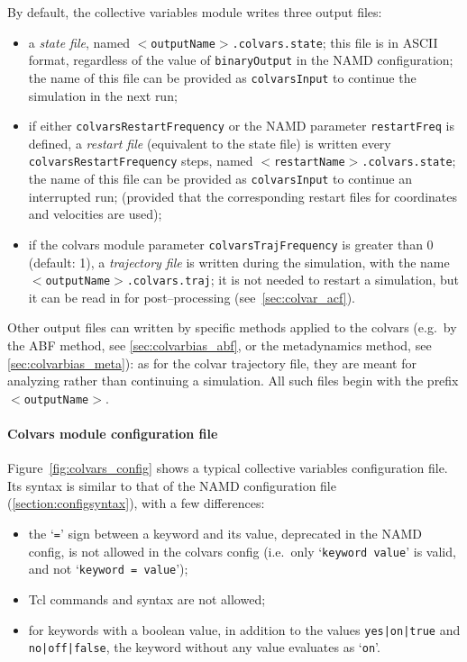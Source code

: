 By default, the collective variables module writes three output
files:
\begin{itemize}

\item a \emph{state file}, named
  \texttt{$<$outputName$>$.colvars.state}; this file is in ASCII
  format, regardless of the value of \texttt{binaryOutput} in the NAMD
  configuration; the name of this file can be provided as
  \texttt{colvarsInput} to continue the simulation in the next run;

\item if either \texttt{colvarsRestartFrequency} or the NAMD parameter
  \texttt{restartFreq} is defined, a
  \emph{restart file} (equivalent to the state file) is written every
  \texttt{colvarsRestartFrequency} steps, named
  \texttt{$<$restartName$>$.colvars.state}; the name of this file
  can be provided as \texttt{colvarsInput} to continue an interrupted run;
  (provided that the corresponding restart files for coordinates
  and velocities are used);

\item if the colvars module parameter \texttt{colvarsTrajFrequency} is
  greater than 0 (default: 1), a \emph{trajectory file} is written
  during the simulation, with the name
  \texttt{$<$outputName$>$.colvars.traj}; it is not needed to restart
  a simulation, but it can be read in for post--processing
  (see~\ref{sec:colvar_acf}).

\end{itemize}

Other output files can written by specific methods applied to the
colvars (e.g.~by the ABF method, see \ref{sec:colvarbias_abf}, or the
metadynamics method, see \ref{sec:colvarbias_meta}): as for the colvar
trajectory file, they are meant for analyzing rather than continuing a
simulation. All such files begin with the prefix
\texttt{$<$outputName$>$}.


\paragraph*{Colvars module configuration file}

Figure~\ref{fig:colvars_config} shows a typical collective variables
configuration file. Its syntax is similar to that of the
NAMD configuration file (\ref{section:configsyntax}), with a few
differences:
\begin{itemize}
\item the `\texttt{=}' sign between a keyword and its value,
  deprecated in the NAMD config, is not allowed in the colvars config
  (i.e.~only `\texttt{keyword value}' is valid, and not
  `\texttt{keyword = value}');
\item Tcl commands and syntax are not allowed;
\item for keywords with a boolean value, in addition to the values
  \texttt{yes|on|true} and \texttt{no|off|false}, the keyword without
  any value evaluates as `\texttt{on}'.
\end{itemize}

